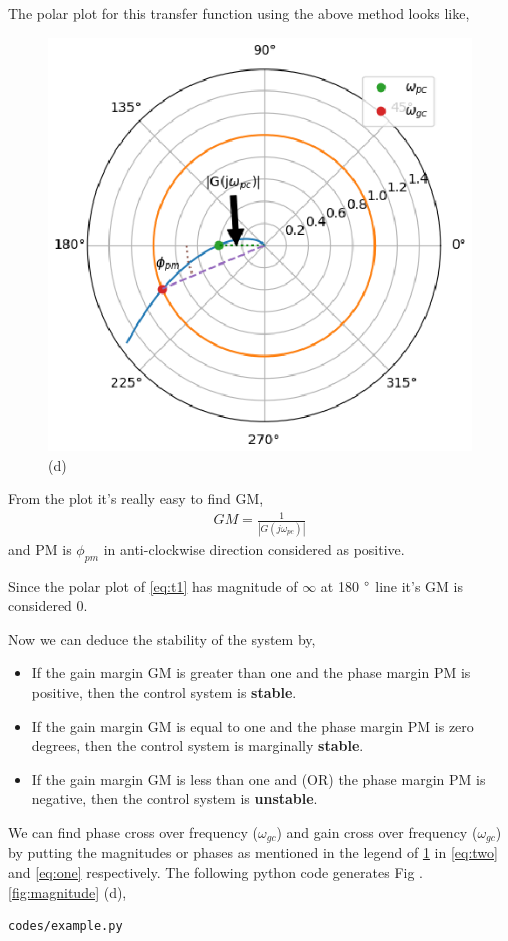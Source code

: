 \begin{enumerate}[label=\thesection.\arabic*.,ref=\thesection.\theenumi]
The polar plot for this transfer function using the above method looks like,
\begin{figure}[!h]
    \includegraphics[width=\columnwidth]{./figs/ee18btech11028/example.eps}
  \caption{(d)}
  \label{fig:example1}
\end{figure}

From the plot it's really easy to find GM,
\begin{align}
    GM = \frac{1}{|G(j\omega_{pc})|}
\end{align}
and PM is $\phi_{pm}$ in anti-clockwise direction considered as positive.

Since the polar plot of \eqref{eq:t1} has magnitude of $\infty$ at 180 $\degree$ line it's GM is considered 0.

Now we can deduce the stability of the system by,
\begin{itemize}
    \item If the gain margin GM is greater than one and the phase margin PM is positive, then the control system is \textbf{stable}.
    \item If the gain margin GM is equal to one and the phase margin PM is zero degrees, then the control system is marginally \textbf{stable}.
    \item If the gain margin GM is less than one and (OR) the phase margin PM is negative, then the control system is \textbf{unstable}.
\end{itemize}


We can find phase cross over frequency ($\omega_{gc}$) and gain cross over frequency ($\omega_{gc}$) by putting the magnitudes or phases as mentioned in the legend of \ref{fig:example1} in \eqref{eq:two}
and \eqref{eq:one} respectively.
The following python code generates  Fig . \ref{fig:magnitude} (d),
\begin{lstlisting}
codes/example.py
\end{lstlisting}


\end{enumerate}
